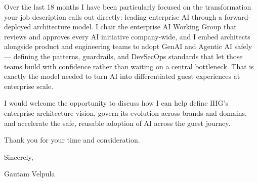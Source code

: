 \documentclass[11pt]{article}
\begin{document}
Over the last 18 months I have been particularly focused on the transformation your job description calls out directly: leading enterprise AI through a forward-deployed architecture model. I chair the enterprise AI Working Group that reviews and approves every AI initiative company-wide, and I embed architects alongside product and engineering teams to adopt GenAI and Agentic AI safely --- defining the patterns, guardrails, and DevSecOps standards that let those teams build with confidence rather than waiting on a central bottleneck. That is exactly the model needed to turn AI into differentiated guest experiences at enterprise scale.

I would welcome the opportunity to discuss how I can help define IHG's enterprise architecture vision, govern its evolution across brands and domains, and accelerate the safe, reusable adoption of AI across the guest journey.

Thank you for your time and consideration.

\vspace{6pt}

Sincerely,

\vspace{6pt}

Gautam Velpula
\end{document}
